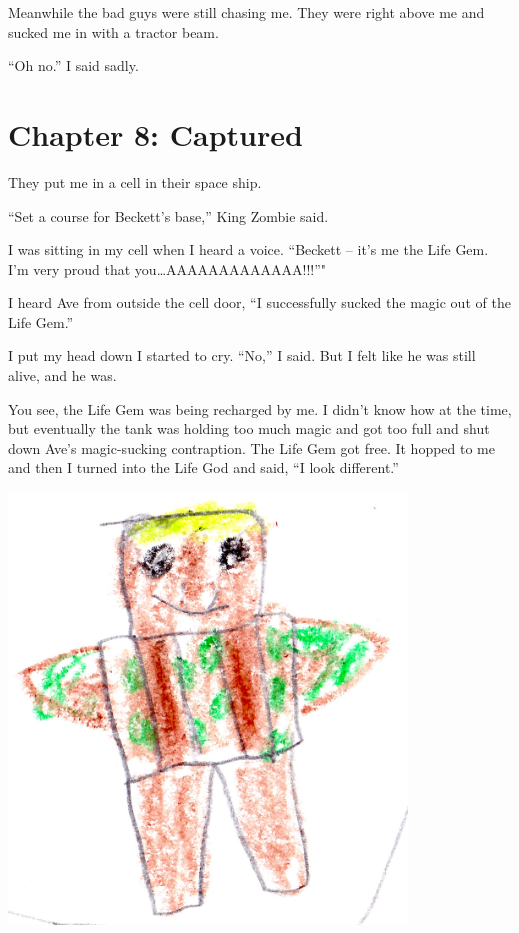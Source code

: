 \documentclass[12pt,oneside]{krantz}
\begin{document}
Meanwhile the bad guys were still chasing me. They were right above me
and sucked me in with a tractor beam.

``Oh no.'' I said sadly.

\hypertarget{chapter-8-captured}{%
\chapter*{Chapter 8: Captured}\label{chapter-8-captured}}


They put me in a cell in their space ship.

``Set a course for Beckett's base,'' King Zombie said.

I was sitting in my cell when I heard a voice. ``Beckett -- it's me the
Life Gem. I'm very proud that you\ldots{}AAAAAAAAAAAAA!!!''"

I heard Ave from outside the cell door, ``I successfully sucked the
magic out of the Life Gem.''

I put my head down I started to cry. ``No,'' I said. But I felt like he
was still alive, and he was.

You see, the Life Gem was being recharged by me. I didn't know how at
the time, but eventually the tank was holding too much magic and got too
full and shut down Ave's magic-sucking contraption. The Life Gem got
free. It hopped to me and then I turned into the Life God and said, ``I
look different.''

\includegraphics[width=4.16667in,height=\textheight]{img/four-bad-guys/lifegod.jpg}
\end{document}
